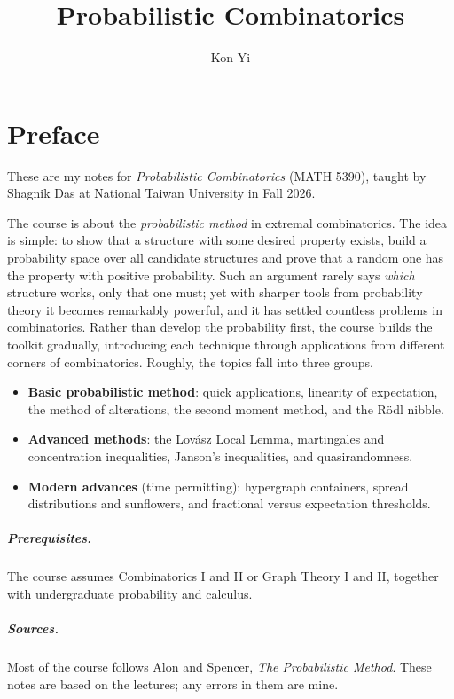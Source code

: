 \documentclass[a4paper,oneside]{scrbook}
\author{Kon Yi}
\title{Probabilistic Combinatorics}
\begin{document}
\maketitle

\chapter*{Preface}\label{ch:preface}

These are my notes for \emph{Probabilistic Combinatorics} (MATH 5390), taught by
Shagnik Das at National Taiwan University in Fall 2026.

The course is about the \emph{probabilistic method} in extremal combinatorics.
The idea is simple: to show that a structure with some desired property exists,
build a probability space over all candidate structures and prove that a random
one has the property with positive probability. Such an argument rarely says
\emph{which} structure works, only that one must; yet with sharper tools from
probability theory it becomes remarkably powerful, and it has settled countless
problems in combinatorics. Rather than develop the probability first, the course
builds the toolkit gradually, introducing each technique through applications
from different corners of combinatorics. Roughly, the topics fall into three
groups.
\begin{itemize}
    \item \textbf{Basic probabilistic method}: quick applications, linearity of
    expectation, the method of alterations, the second moment method, and the
    R\"odl nibble.
    \item \textbf{Advanced methods}: the Lov\'asz Local Lemma, martingales and
    concentration inequalities, Janson's inequalities, and quasirandomness.
    \item \textbf{Modern advances} (time permitting): hypergraph containers,
    spread distributions and sunflowers, and fractional versus expectation
    thresholds.
\end{itemize}

\paragraph{Prerequisites.}
The course assumes Combinatorics I and II or Graph Theory I and II, together
with undergraduate probability and calculus.

\paragraph{Sources.}
Most of the course follows Alon and Spencer, \emph{The Probabilistic Method}.
These notes are based on the lectures; any errors in them are mine.
\end{document}

